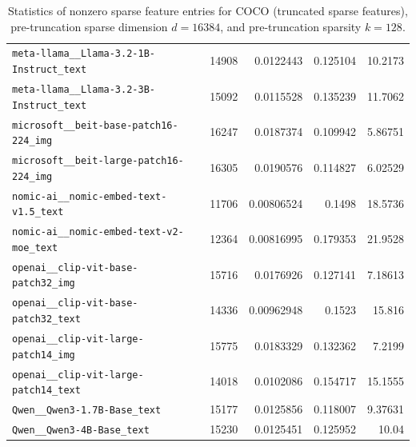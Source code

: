 \begin{table}[htbp]
{\begin{tabular}{lrrrr}
\texttt{meta-llama\_\_Llama-3.2-1B-Instruct\_text} & 14908 & 0.0122443 & 0.125104 & 10.2173 \\
\texttt{meta-llama\_\_Llama-3.2-3B-Instruct\_text} & 15092 & 0.0115528 & 0.135239 & 11.7062 \\
\texttt{microsoft\_\_beit-base-patch16-224\_img} & 16247 & 0.0187374 & 0.109942 & 5.86751 \\
\texttt{microsoft\_\_beit-large-patch16-224\_img} & 16305 & 0.0190576 & 0.114827 & 6.02529 \\
\texttt{nomic-ai\_\_nomic-embed-text-v1.5\_text} & 11706 & 0.00806524 & 0.1498 & 18.5736 \\
\texttt{nomic-ai\_\_nomic-embed-text-v2-moe\_text} & 12364 & 0.00816995 & 0.179353 & 21.9528 \\
\texttt{openai\_\_clip-vit-base-patch32\_img} & 15716 & 0.0176926 & 0.127141 & 7.18613 \\
\texttt{openai\_\_clip-vit-base-patch32\_text} & 14336 & 0.00962948 & 0.1523 & 15.816 \\
\texttt{openai\_\_clip-vit-large-patch14\_img} & 15775 & 0.0183329 & 0.132362 & 7.2199 \\
\texttt{openai\_\_clip-vit-large-patch14\_text} & 14018 & 0.0102086 & 0.154717 & 15.1555 \\
\texttt{Qwen\_\_Qwen3-1.7B-Base\_text} & 15177 & 0.0125856 & 0.118007 & 9.37631 \\
\texttt{Qwen\_\_Qwen3-4B-Base\_text} & 15230 & 0.0125451 & 0.125952 & 10.04 \\
\bottomrule
\end{tabular}
}%
\caption{Statistics of nonzero sparse feature entries for COCO (truncated sparse features), pre-truncation sparse dimension $d=16384$, and pre-truncation sparsity $k=128$.}
\label{tab:sparse-feature-entries-coco-truncated-d16384-k128}
\end{table}
